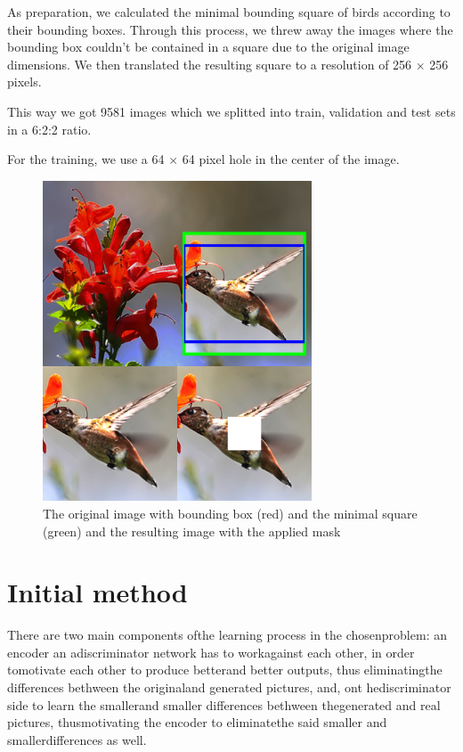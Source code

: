 \documentclass[conference]{IEEEtran}
\begin{document}
As preparation, we calculated the minimal bounding square of birds according to their bounding boxes. Through this process, we threw away the images where the bounding box couldn't be contained in a square due to the original image dimensions. We then translated the resulting square to a resolution of 256  $\times$ 256 pixels.

This way we got 9581 images which we splitted into train, validation and test sets in a 6:2:2 ratio. 

For the training, we use a 64 $\times$ 64 pixel hole in the center of the image.

\begin{figure}
  \centering
  \includegraphics[width=80mm, keepaspectratio]{figures/preparation.png}
  \caption{The original image with bounding box (red) and the minimal square (green) and the resulting image with the applied mask}
  \label{fig:Preparation}
\end{figure}


\section{Initial method}
There are two main components ofthe learning process in the chosenproblem: an encoder an adiscriminator network has to workagainst each other, in order tomotivate each other to produce betterand better outputs, thus eliminatingthe differences bethween the originaland generated pictures, and, ont hediscriminator side to learn the  smallerand smaller differences bethween thegenerated and real pictures, thusmotivating the encoder to eliminatethe said smaller and smallerdifferences as well. 
\end{document}
